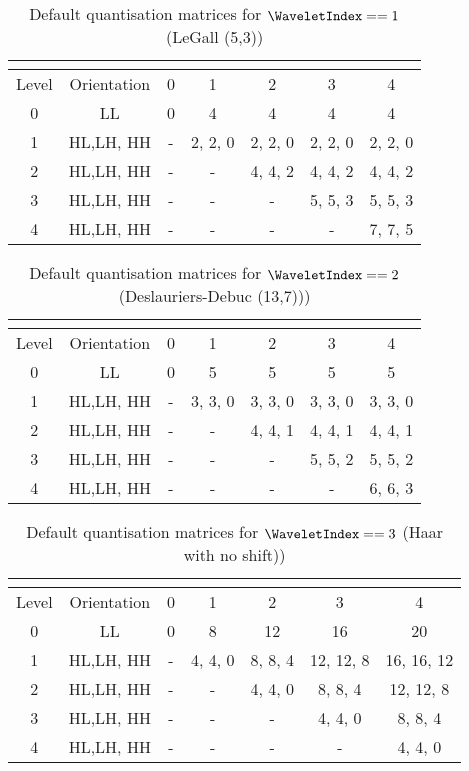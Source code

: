 \begin{table}[!ht]
\centering
\begin{tabular}{|c|c|c|c|c|c|c|}
\hline
\multicolumn{2}{|c|}{\cellcolor[gray]{0.75}}& \multicolumn{5}{|c|}{\cellcolor[gray]{0.75}{$\TransformDepth$}} \\
\hline
Level & Orientation & 0 & 1 & 2 & 3 & 4 \\
\hline
0 & LL & 0 & 4 & 4 & 4 & 4\\
\hline
1 & HL,LH, HH & - & 2, 2, 0 & 2, 2, 0 & 2, 2, 0 & 2, 2, 0  \\
\hline
2 & HL,LH, HH & - & - & 4, 4, 2 & 4, 4, 2 & 4, 4, 2  \\
\hline
3 & HL,LH, HH & - & - & - & 5, 5, 3 & 5, 5, 3  \\
\hline
4 & HL,LH, HH & - & - & - & - & 7, 7, 5  \\
\hline
\end{tabular}
\caption{Default quantisation matrices for $\WaveletIndex==1$ (LeGall (5,3)) 
\label{table:qm1}}
\end{table}

\begin{table}[!ht]
\centering
\begin{tabular}{|c|c|c|c|c|c|c|}
\hline
\multicolumn{2}{|c|}{\cellcolor[gray]{0.75}}& \multicolumn{5}{|c|}{\cellcolor[gray]{0.75}{$\TransformDepth$}} \\
\hline
Level & Orientation & 0 & 1 & 2 & 3 & 4 \\
\hline
0 & LL & 0 & 5 & 5 & 5 & 5\\
\hline
1 & HL,LH, HH & - & 3, 3, 0 & 3, 3, 0 & 3, 3, 0 & 3, 3, 0  \\
\hline
2 & HL,LH, HH & - & - & 4, 4, 1 & 4, 4, 1 & 4, 4, 1  \\
\hline
3 & HL,LH, HH & - & - & - & 5, 5, 2 & 5, 5, 2  \\
\hline
4 & HL,LH, HH & - & - & - & - & 6, 6, 3  \\
\hline
\end{tabular}
\caption{Default quantisation matrices for $\WaveletIndex==2$ (Deslauriers-Debuc (13,7))) 
\label{table:qm2}}
\end{table}

\begin{table}[!ht]
\centering
\begin{tabular}{|c|c|c|c|c|c|c|}
\hline
\multicolumn{2}{|c|}{\cellcolor[gray]{0.75}}& \multicolumn{5}{|c|}{\cellcolor[gray]{0.75}{$\TransformDepth$}} \\
\hline
Level & Orientation & 0 & 1 & 2 & 3 & 4 \\
\hline
0 & LL & 0 & 8 & 12 & 16 & 20\\
\hline
1 & HL,LH, HH & - & 4, 4, 0 & 8, 8, 4 & 12, 12, 8 & 16, 16, 12  \\
\hline
2 & HL,LH, HH & - & - & 4, 4, 0 & 8, 8, 4 & 12, 12, 8  \\
\hline
3 & HL,LH, HH & - & - & - & 4, 4, 0 & 8, 8, 4  \\
\hline
4 & HL,LH, HH & - & - & - & - & 4, 4, 0  \\
\hline
\end{tabular}
\caption{Default quantisation matrices for $\WaveletIndex==3$ (Haar with no shift)) 
\label{table:qm3}}
\end{table}


